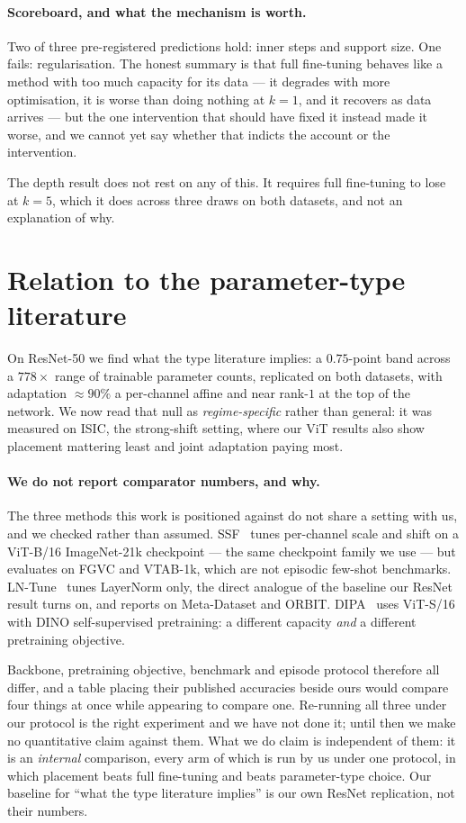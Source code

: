 \documentclass[11pt]{article}
\begin{document}
\paragraph{Scoreboard, and what the mechanism is worth.}
Two of three pre-registered predictions hold: inner steps and support size. One fails:
regularisation. The honest summary is that full fine-tuning behaves like a method with
too much capacity for its data --- it degrades with more optimisation, it is worse than
doing nothing at $k=1$, and it recovers as data arrives --- but the one intervention
that should have fixed it instead made it worse, and we cannot yet say whether that
indicts the account or the intervention.

The depth result does not rest on any of this. It requires full fine-tuning to lose at
$k=5$, which it does across three draws on both datasets, and not an explanation of
why.

\section{Relation to the parameter-type literature}
\label{sec:related}

On ResNet-50 we find what the type literature implies: a $0.75$-point band across a
$778\times$ range of trainable parameter counts, replicated on both datasets, with
adaptation $\approx 90\%$ a per-channel affine and near rank-$1$ at the top of the
network. We now read that null as \emph{regime-specific} rather than general: it was
measured on ISIC, the strong-shift setting, where our ViT results also show placement
mattering least and joint adaptation paying most.
\paragraph{We do not report comparator numbers, and why.}
The three methods this work is positioned against do not share a setting with us, and we
checked rather than assumed. SSF~\cite{lian2022} tunes per-channel scale and shift on a
ViT-B/16 ImageNet-21k checkpoint --- the same checkpoint family we use --- but evaluates
on FGVC and VTAB-1k, which are not episodic few-shot benchmarks. LN-Tune~\cite{basu2024}
tunes LayerNorm only, the direct analogue of the baseline our ResNet result turns on, and
reports on Meta-Dataset and ORBIT. DIPA~\cite{perera2024} uses ViT-S/16 with DINO
self-supervised pretraining: a different capacity \emph{and} a different pretraining
objective.

Backbone, pretraining objective, benchmark and episode protocol therefore all differ,
and a table placing their published accuracies beside ours would compare four things at
once while appearing to compare one. Re-running all three under our protocol is the
right experiment and we have not done it; until then we make no quantitative claim
against them. What we do claim is independent of them: it is an \emph{internal}
comparison, every arm of which is run by us under one protocol, in which placement
beats full fine-tuning and beats parameter-type choice. Our baseline for ``what the type
literature implies'' is our own ResNet replication, not their numbers.
\end{document}
